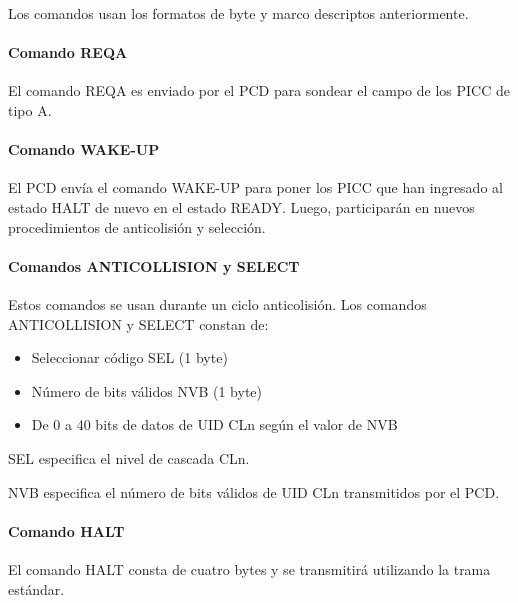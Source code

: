 Los comandos usan los formatos de byte y marco descriptos anteriormente.\par

\paragraph{Comando REQA}
El comando REQA es enviado por el PCD para sondear el campo de los PICC de tipo A.\par

\paragraph{Comando WAKE-UP}
El PCD envía el comando WAKE-UP para poner los PICC que han ingresado al estado HALT de nuevo en el estado READY. Luego, participarán en nuevos procedimientos de anticolisión y selección.\par

\paragraph{Comandos ANTICOLLISION y SELECT}
Estos comandos se usan durante un ciclo anticolisión. Los comandos ANTICOLLISION y SELECT constan de:\par

\begin{itemize}
	\item Seleccionar código SEL (1 byte)\par

	\item Número de bits válidos NVB (1 byte)\par

	\item De 0 a 40 bits de datos de UID CLn según el valor de NVB
\end{itemize}\par

SEL especifica el nivel de cascada CLn.\par

NVB especifica el número de bits válidos de UID CLn transmitidos por el PCD.\par

\paragraph{Comando HALT}
El comando HALT consta de cuatro bytes y se transmitirá utilizando la trama estándar.\par



